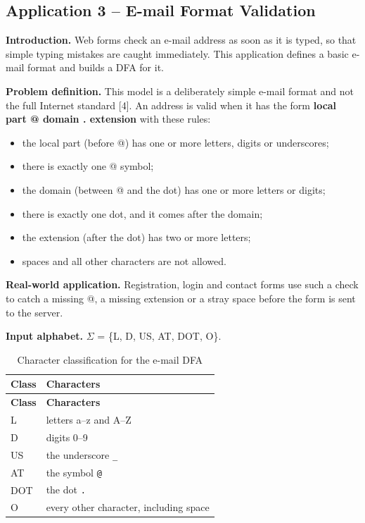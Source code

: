 \documentclass[12pt,a4paper]{article}
\begin{document}
\subsection{Application 3 -- E-mail Format Validation}

\textbf{Introduction.} Web forms check an e-mail address as soon as it is typed, so that simple typing mistakes are caught immediately. This application defines a basic e-mail format and builds a DFA for it.

\textbf{Problem definition.} This model is a deliberately simple e-mail format and not the full Internet standard [4]. An address is valid when it has the form \textbf{local part @ domain . extension} with these rules:

\begin{itemize}
\item the local part (before @) has one or more letters, digits or underscores;
\item there is exactly one @ symbol;
\item the domain (between @ and the dot) has one or more letters or digits;
\item there is exactly one dot, and it comes after the domain;
\item the extension (after the dot) has two or more letters;
\item spaces and all other characters are not allowed.
\end{itemize}

\textbf{Real-world application.} Registration, login and contact forms use such a check to catch a missing @, a missing extension or a stray space before the form is sent to the server.

\textbf{Input alphabet.} \ensuremath{\Sigma} = \{L, D, US, AT, DOT, O\}.

{\small
\begin{longtable}{|>{\centering\arraybackslash}p{}|>{\raggedright\arraybackslash}p{}|}
\caption[Character classification for the e-mail DFA]{Character classification for the e-mail DFA}\label{tab:em_classes}\\
\hline
\rowcolor{hdr}\textbf{Class} & \textbf{Characters}\\ \hline
\endfirsthead
\hline
\rowcolor{hdr}\textbf{Class} & \textbf{Characters}\\ \hline
\endhead
L & letters a--z and A--Z\\ \hline
D & digits 0--9\\ \hline
US & the underscore \texttt{\_}\\ \hline
AT & the symbol \texttt{@}\\ \hline
DOT & the dot \texttt{.}\\ \hline
O & every other character, including space\\ \hline
\end{longtable}}
\end{document}
